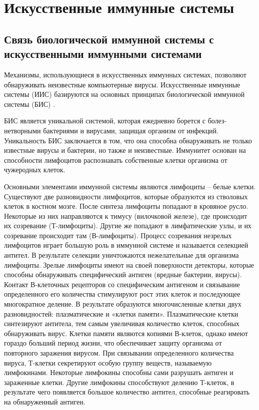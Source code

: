 \documentclass[bachelor, och, referat]{template}
\begin{document}
\section{Искусственные иммунные системы} 
\subsection{Связь биологической иммунной системы с искусственными иммунными системами}

Механизмы, использующиеся в ис­кусственных иммунных системах, позволяют обнаруживать неизвестные
компьютерные вирусы. Искусственные иммунные системы (ИИС) 
базируются на основных принципах биологической иммунной системы (БИС) \cite{ais1}.

БИС является уникальной системой, которая ежедневно борется с болез­нетворными 
бактериями и вирусами, защищая организм от инфекций.
Уникальность БИС заключается в том, что она способна обнаруживать не
только известные вирусы и бактерии, но также и неизвестные. Иммунитет
основан на способности лимфоцитов распознавать собственные клетки
организма от чужеродных клеток.

Основными элементами иммунной системы являются лимфоциты – белые клетки.
Существуют две разновидности лимфоцитов, которые образуются из стволовых клеток в
костном мозге. После синтеза лимфоциты попадают в кровяное русло. Некоторые из них
направляются к тимусу (вилочковой железе), где происходит их созревание (Т-лимфоциты). 
Другие же попадают в лимфатические узлы, и их созревание происходит
там (В-лимфоциты). Процесс созревания незрелых лимфоцитов играет большую роль в
иммунной системе и называется селекцией антител. В результате селекции уничтожаются 
нежелательные для организма лимфоциты. Зрелые лимфоциты имеют на своей поверхности 
детекторы, которые способны обнаруживать специфический антиген (вредные
бактерии, вирусы). Контакт В-клеточных рецепторов со специфическим антигеном и 
связывание определенного его количества стимулируют рост этих клеток и последующее 
многократное деление. В результате образуются многочисленные клетки двух разновидностей:
плазматические и «клетки памяти». Плазматические клетки синтезируют антитела, тем самым 
увеличивая количество клеток, способных обнаруживать вирус. Клетки памяти являются 
копиями В-клеток, однако имеют гораздо больший период жизни, что обеспечивает
защиту организма от повторного заражения вирусом. При связывании определенного
количества вируса, Т-клетки секретируют особую группу веществ, называемую лимфокинами. 
Некоторые лимфокины способны сами разрушать антиген и зараженные клетки.
Другие лимфокины способствуют делению Т-клеток, в результате чего появляется
большое количество антител, способные реагировать на обнаруженный антиген.
\end{document}
